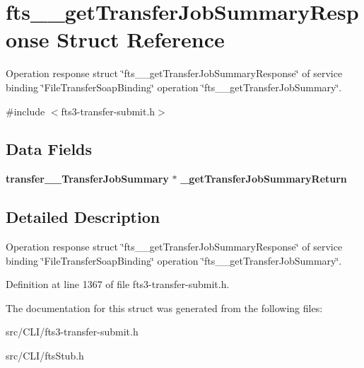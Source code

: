 \section{fts\_\-\_\-getTransferJobSummaryResponse Struct Reference}
\label{structfts____getTransferJobSummaryResponse}


Operation response struct \char`\"{}fts\_\-\_\-getTransferJobSummaryResponse\char`\"{} of service binding \char`\"{}FileTransferSoapBinding\char`\"{} operation \char`\"{}fts\_\-\_\-getTransferJobSummary\char`\"{}.  




{\ttfamily \#include $<$fts3-\/transfer-\/submit.h$>$}

\subsection*{Data Fields}
\begin{DoxyCompactItemize}
\item 
{\bf transfer\_\-\_\-TransferJobSummary} $\ast$ {\bfseries \_\-getTransferJobSummaryReturn}\label{structfts____getTransferJobSummaryResponse_acad860e381fa91fd042835b543b0fb4a}

\end{DoxyCompactItemize}


\subsection{Detailed Description}
Operation response struct \char`\"{}fts\_\-\_\-getTransferJobSummaryResponse\char`\"{} of service binding \char`\"{}FileTransferSoapBinding\char`\"{} operation \char`\"{}fts\_\-\_\-getTransferJobSummary\char`\"{}. 

Definition at line 1367 of file fts3-\/transfer-\/submit.h.



The documentation for this struct was generated from the following files:\begin{DoxyCompactItemize}
\item 
src/CLI/fts3-\/transfer-\/submit.h\item 
src/CLI/ftsStub.h\end{DoxyCompactItemize}
